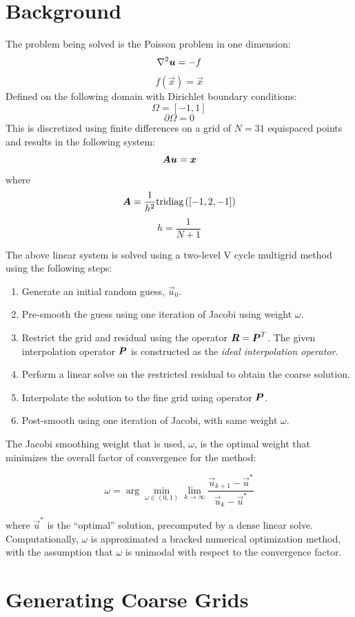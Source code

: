 


\section{Background}
The problem being solved is the Poisson problem in one dimension:
$$ \nabla^2\bm{{u}} = -f $$
$$ f(\vec{x}) = \vec{x} $$
Defined on the following domain with Dirichlet boundary conditions:
$$ \Omega = \left[-1, 1\right]$$
$$ \partial\Omega = 0 $$
This is discretized using finite differences on a grid of $N=31$ equispaced points and results in the following system:
$$ \bm{{A}}\bm{{u}} = \bm{{x}} $$
where
$$\bm{{A}} = \frac{1}{h^2} \text{tridiag}\left(\left[-1, 2, -1\right]\right)$$
$$h = \frac{1}{N+1}$$

The above linear system is solved using a two-level V cycle multigrid method using the following steps:

\begin{enumerate}
\item Generate an initial random guess, $\vec{u}_0$.
\item Pre-smooth the guess using one iteration of Jacobi using weight $\omega$.
\item Restrict the grid and residual using the operator $\bm{{R}}=\bm{{P}}^T$.  The given interpolation operator $\bm{{P}}$ is constructed as the \textit{ideal interpolation operator}.
\item Perform a linear solve on the restricted residual to obtain the coarse solution.
\item Interpolate the solution to the fine grid using operator $\bm{{P}}$.
\item Post-smooth using one iteration of Jacobi, with same weight $\omega$.
\end{enumerate}

The Jacobi smoothing weight that is used, $\omega$, is the optimal weight that minimizes the overall factor of convergence for the method:

$$\omega = \arg \min_{\omega\in\left(0,1\right)} \lim_{k\to\infty} \frac{ \vec{u}_{k+1} - \vec{u}^* }{ \vec{u}_{k} - \vec{u}^* }$$

where $\vec{u}^*$ is the ``optimal'' solution, precomputed by a dense linear solve.  Computationally, $\omega$ is approximated a bracked numerical optimization method, with the assumption that $\omega$ is unimodal with respect to the convergence factor.

\section{Generating Coarse Grids}

